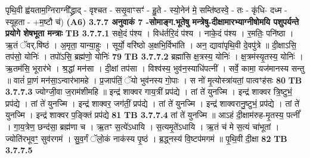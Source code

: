 \documentclass[17pt]{extarticle}
\begin{document}
{{{{{{{{{{{{{{{{{{{पृथि॒वी ह्व॑यताम॒ग्निराग्नी᳚द्ध्राद् - वृश्चत - ससृ॒वाꣳसꣳ॑ - हु॒ते - स्यो॒नेन॑ मे॒ सम्ति॑ष्ठस्वे॒ - तः - कृ॑धि- दध्म - स्यूहता - +म॒ष्टौ च॑) \textbf{(A6)} \newline \newline
                \textbf{ 3.7.7     अनुवाकं   7 -सोमाङ्ग.भूतेषु मन्त्रेषु-दीक्षामारभ्याग्नीषोमयि पशुपर्यन्ते प्रयोगे शेषभूता मन्त्राः} \newline
                                \textbf{ TB 3.7.7.1} \newline
                  सक्षे॒दं प॑श्य । विध॑र्तरि॒दं प॑श्य । नाके॒दं प॑श्य । र॒मतिः॒ पनि॑ष्ठा । ऋ॒तं ॅवर्.षि॑ष्ठं । अ॒मृता॒ यान्या॒हुः । सूर्यो॒ वरि॑ष्ठो अ॒क्षभि॒र्विभा॑ति । अन॒ द्यावा॑पृथि॒वी दे॒वपु॑त्रे ॥ दी॒क्षाऽसि॒ तप॑सो॒ योनिः॑ । तपो॑ऽसि॒ ब्रह्म॑णो॒ योनिः॑ \textbf{ 79} \newline
                  \newline
                                \textbf{ TB 3.7.7.2} \newline
                  ब्रह्मा॑सि क्ष॒त्रस्य॒ योनिः॑ । क्ष॒त्रम॑स्यृ॒तस्य॒ योनिः॑ । ऋ॒तम॑सि॒ भूरार॑भे । श्र॒द्धां मन॑सा । दी॒क्षां तप॑सा । विश्व॑स्य॒ भुव॑न॒स्याधि॑पत्नीं । सर्वे॒ कामा॒ यज॑मानस्य सन्तु ॥ वातं॑ प्रा॒णं मन॑सा॒ऽन्वार॑भामहे । प्र॒जाप॑तिं॒ ॅयो भुव॑नस्य गो॒पाः । स नो॑ मृ॒त्योस्त्रा॑यतां॒ पात्वꣳह॑सः \textbf{ 80} \newline
                  \newline
                                \textbf{ TB 3.7.7.3} \newline
                  ज्योग्जी॒वा ज॒राम॑शीमहि ॥ इन्द्र॑ शाक्वर गाय॒त्रीं प्रप॑द्ये । तां ते॑ युनज्मि । इन्द्र॑ शाक्वर त्रि॒ष्टुभं॒ प्रप॑द्ये । तां ते॑ युनज्मि । इन्द्र॑ शाक्वर॒ जग॑तीं॒ प्रप॑द्ये । तां ते॑ युनज्मि । इन्द्र॑ शाक्वरानु॒ष्टुभं॒ प्रप॑द्ये । तां ते॑ युनज्मि । इन्द्र॑ शाक्वर प॒ङ्क्तिं प्रप॑द्ये \textbf{ 81} \newline
                  \newline
                                \textbf{ TB 3.7.7.4} \newline
                  तां ते॑ युनज्मि ॥ आऽहं दी॒क्षाम॑रुह-मृ॒तस्य॒ पत्नीं᳚ । गा॒य॒त्रेण॒ छन्द॑सा॒ ब्रह्म॑णा च । ऋ॒तꣳ स॒त्ये॑ऽधायि । स॒त्यमृ॒ते॑ऽधायि । ऋ॒तं च॑ मे स॒त्यं चा॑भूतां । ज्योति॑रभूवꣳ॒॒ सुव॑रगमं । सु॒व॒र्गं ॅलो॒कं नाक॑स्य पृ॒ष्ठं । ब्र॒द्ध्नस्य॑ वि॒ष्टप॑मगमं ॥ पृ॒थि॒वी दी॒क्षा \textbf{ 82} \newline
                  \newline
                                \textbf{ TB 3.7.7.5} \newline
}}}}}}}}}}}}}}}}}}}
\end{document}
